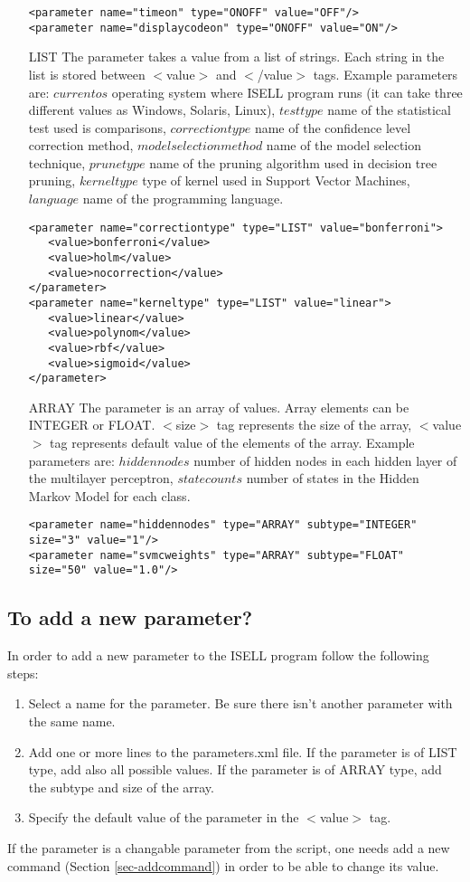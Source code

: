 \documentclass[a4paper,12pt]{book}
\begin{document}
\begin{itemize}
\begin{verbatim}
<parameter name="timeon" type="ONOFF" value="OFF"/>
<parameter name="displaycodeon" type="ONOFF" value="ON"/>
\end{verbatim}
\item[LIST] The parameter takes a value from a list of strings. Each string in the list is stored between $<$value$>$ and $<$/value$>$ tags. Example parameters are: $currentos$ operating system where ISELL program runs (it can take three different values as Windows, Solaris, Linux), $testtype$ name of the statistical test used is comparisons, $correctiontype$ name of the confidence level correction method, $modelselectionmethod$ name of the model selection technique, $prunetype$ name of the pruning algorithm used in decision tree pruning, $kerneltype$ type of kernel used in Support Vector Machines, $language$ name of the programming language.
\begin{verbatim}
<parameter name="correctiontype" type="LIST" value="bonferroni">
   <value>bonferroni</value>
   <value>holm</value>
   <value>nocorrection</value>
</parameter>
<parameter name="kerneltype" type="LIST" value="linear">
   <value>linear</value>
   <value>polynom</value>
   <value>rbf</value>
   <value>sigmoid</value>
</parameter>
\end{verbatim}
\item[ARRAY] The parameter is an array of values. Array elements can be INTEGER or FLOAT. $<$size$>$ tag represents the size of the array, $<$value$>$ tag represents default value of the elements of the array. Example parameters are: $hiddennodes$ number of hidden nodes in each hidden layer of the multilayer perceptron, $statecounts$ number of states in the Hidden Markov Model for each class.
\begin{verbatim}
<parameter name="hiddennodes" type="ARRAY" subtype="INTEGER" size="3" value="1"/>
<parameter name="svmcweights" type="ARRAY" subtype="FLOAT" size="50" value="1.0"/>
\end{verbatim}
\end{itemize}

\subsection{To add a new parameter?}
In order to add a new parameter to the ISELL program follow the following steps:
\begin{enumerate}
\item Select a name for the parameter. Be sure there isn't another parameter with the same name.
\item Add one or more lines to the parameters.xml file. If the parameter is of LIST type, add also all possible values. If the parameter is of ARRAY type, add the subtype and size of the array.
\item Specify the default value of the parameter in the $<$value$>$ tag.
\end{enumerate}
If the parameter is a changable parameter from the script, one needs add a new command (Section \ref{sec-addcommand}) in order to be able to change its value.
\end{document}
